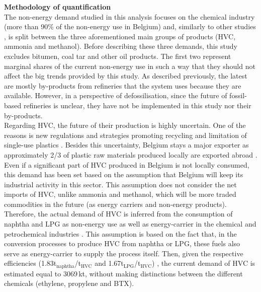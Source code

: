 \vspace{0.2cm}\textbf{Methodology of quantification}\vspace{-0.3cm}\\

The non-energy demand studied in this analysis focuses on the chemical industry (more than 90\% of the non-energy use in Belgium) and, similarly to other studies \cite{IEA2018_petrochemicals, daioglou2014energy}, is split between the three aforementioned main groups of products (\ie \gls{HVC}, ammonia and methanol). Before describing these three demands, this study excludes bitumen, coal tar and \og other oil products\fg. The first two represent marginal shares of the current non-energy use in such a way that they should not affect the big trends provided by this study. As described previously, the latest are mostly by-products from refineries that the system uses because they are available. However, in a perspective of defossilisation, since the future of fossil-based refineries is unclear, they have not be implemented in this study nor their by-products.\\

Regarding \gls{HVC}, the future of their production is highly uncertain. One of the reasons is new regulations and strategies promoting recycling and limitation of single-use plastics \cite{EU_plastics}.  Besides this uncertainty, Belgium stays a major exporter as approximately 2/3 of plastic raw materials produced locally are exported abroad \cite{agoria_plastics}. Even if a significant part of \gls{HVC} produced in Belgium is not locally consumed, this demand has been set based on the assumption that Belgium will keep its industrial activity in this sector. This assumption does not consider the net imports of \gls{HVC}, unlike ammonia and methanol, which will be more traded commodities in the future (as energy carriers and non-energy products). Therefore, the actual demand of \gls{HVC} is inferred from the consumption of naphtha and \gls{LPG} as non-energy use as well as energy-carrier in the chemical and petrochemical industries \cite{statbel_NED_2019}. This assumption is based on the fact that, in the conversion processes to produce \gls{HVC} from naphtha or \gls{LPG}, these fuels also serve as energy-carrier to supply the process itself. Then, given the respective efficiencies (1.83t$_{\text{naphtha}}$/t$_{\text{HVC}}$ and 1.67t$_{\text{LPG}}$/t$_{\text{HVC}}$) \cite{IEA2018_petrochemicals}, the current demand of \gls{HVC} is estimated equal to 3069\,kt, without making distinctions between the different chemicals (\ie ethylene, propylene and \gls{BTX}). \\


